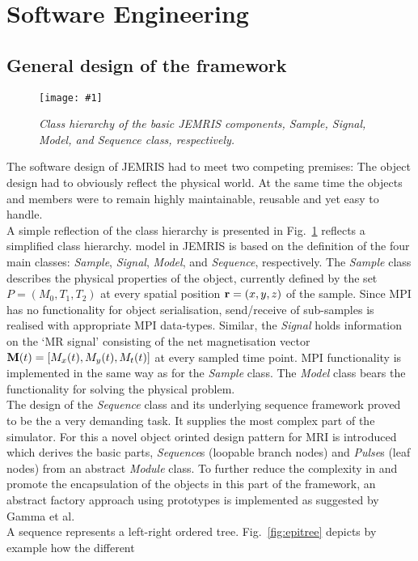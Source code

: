 \documentclass{nic-series}
\newcommand{\epsfigure}[5]{
 \begin{figure}[#4!]
   \begin{center}
    \texttt{[image: \#1]}
    \caption{{\sl #2}\label{#3}}
   \end{center}
 \end{figure}}
\begin{document}
\section{Software Engineering}
\subsection{General design of the framework}
\epsfigure{fig/jemris-classes.eps}{Class hierarchy of the basic JEMRIS components, Sample, Signal, Model, and Sequence class,
                            respectively.}{fig:classes}{bp}{1.0}
The software design of JEMRIS had to meet two competing
premises: The object design had to obviously reflect the physical
world. At the same time the objects and members were to remain highly
maintainable, reusable and yet easy to handle.
\\
A simple reflection of the class hierarchy is presented in
Fig.~\ref{fig:classes} reflects a simplified class hierarchy.
model in JEMRIS is based on the definition of the four main
classes: {\it Sample}, {\it Signal}, {\it Model}, and {\it Sequence},
respectively. The {\it Sample} class describes the physical properties
of the object, currently defined by the set $P=(M_0,T_1,T_2)$ at every
spatial position ${\bf r}=(x,y,z)$ of the sample. Since MPI has no
functionality for object serialisation, send/receive of sub-samples is
realised with appropriate MPI data-types. Similar, the {\it Signal}
holds information on the `MR signal' consisting of the net
magnetisation vector ${\bf M}(t)=[M_x(t),M_y(t),M_t(t)]$ at every
sampled time point. MPI functionality is implemented in the same way
as for the {\it Sample} class. The {\it Model} class bears the
functionality for solving the physical problem. 
\\
The design of the {\it Sequence} class and its underlying
sequence framework proved to be the a very demanding task. It supplies
the most complex part of the simulator. For this a novel object
orinted design pattern for MRI is introduced which derives the basic
parts, {\it Sequence}s (loopable branch nodes) and {\it Pulse}s (leaf
nodes) from an abstract {\it Module} class. To further reduce the complexity in and
promote the encapsulation of the objects in this part of the framework,
an abstract factory approach using prototypes is implemented as suggested by
Gamma et al\cite{gamma}. 
\\
A sequence represents a left-right ordered tree. Fig.~\ref{fig:epitree} depicts by example how the different
\end{document}
